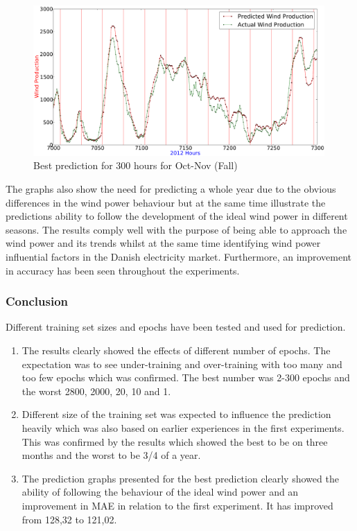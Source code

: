 \begin{figure}[H]
\centering
\includegraphics[width=0.99\textwidth]{billeder/bestPossiblePredictionWindProduction7000-7300_Fall.png}
\caption{Best prediction for 300 hours for Oct-Nov (Fall)}
\label{fig:bestPredictWPFall}
\end{figure}

The graphs also show the need for predicting a whole year due to the obvious differences in the wind power behaviour but at the same time illustrate the predictions ability to follow the development of the ideal wind power in different seasons. The results comply well with the purpose of being able to approach the wind power and its trends whilst at the same time identifying wind power influential factors in the Danish electricity market. Furthermore, an improvement in accuracy has been seen throughout the experiments.

\subsubsection{Conclusion}
Different training set sizes and epochs have been tested and used for prediction.

\begin{enumerate}
\item The results clearly showed the effects of different number of epochs. The expectation was to see under-training and over-training with too many and too few epochs which was confirmed. The best number was 2-300 epochs and the worst 2800, 2000, 20, 10 and 1.
\item Different size of the training set was expected to influence the prediction heavily which was also based on earlier experiences in the first experiments. This was confirmed by the results which showed the best to be on three months and the worst to be 3/4 of a year.
\item The prediction graphs presented for the best prediction clearly showed the ability of following the behaviour of the ideal wind power and an improvement in MAE in relation to the first experiment. It has improved from 128,32 to 121,02.
\end{enumerate}

